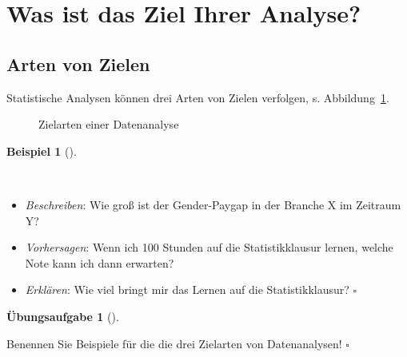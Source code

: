 \documentclass[
  letterpaper,
  twoside,
  open=any]{scrbook}
\providecommand{\tightlist}{%
  \setlength{\itemsep}{0pt}\setlength{\parskip}{0pt}}\usepackage{longtable,booktabs,array}
\theoremstyle{definition}
\theoremstyle{definition}
\newtheorem{exercise}{Übungsaufgabe}[chapter]
\theoremstyle{definition}
\newtheorem{example}{Beispiel}[chapter]
\theoremstyle{remark}
\begin{document}
\section{Was ist das Ziel Ihrer
Analyse?}\label{was-ist-das-ziel-ihrer-analyse}

\subsection{Arten von Zielen}\label{arten-von-zielen}

Statistische Analysen können drei Arten von Zielen verfolgen, s.
Abbildung~\ref{fig-ziele}.

\begin{figure}


\caption{\label{fig-ziele}Zielarten einer Datenanalyse}

\end{figure}%

\begin{example}[]\protect\hypertarget{exm-zielarten}{}\label{exm-zielarten}

~

\begin{itemize}
\tightlist
\item
  \emph{Beschreiben}: Wie groß ist der Gender-Paygap in der Branche X im
  Zeitraum Y?
\item
  \emph{Vorhersagen}: Wenn ich 100 Stunden auf die Statistikklausur
  lernen, welche Note kann ich dann erwarten?
\item
  \emph{Erklären}: Wie viel bringt mir das Lernen auf die
  Statistikklausur? \(\square\)
\end{itemize}

\end{example}

\begin{exercise}[]\protect\hypertarget{exr-ziele-stat}{}\label{exr-ziele-stat}

Benennen Sie Beispiele für die die drei Zielarten von Datenanalysen!
\(\square\)

\end{exercise}
\end{document}
